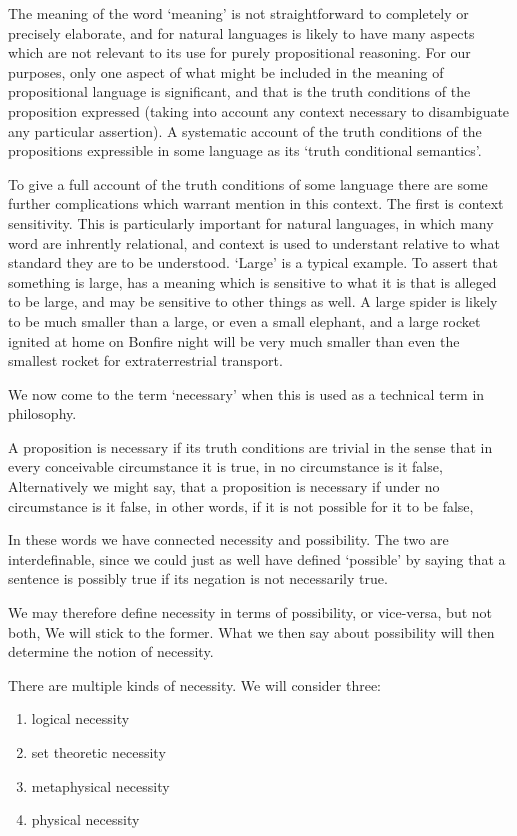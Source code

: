 The meaning of the word `meaning' is not straightforward to completely or precisely elaborate, and for natural languages is likely to have many aspects which are not relevant to its use for purely propositional reasoning.
For our purposes, only one aspect of what might be included in the meaning of propositional language is significant, and that is the truth conditions of the proposition expressed (taking into account any context necessary to disambiguate any particular assertion).
A systematic account of the truth conditions of the propositions expressible in some language as its `truth conditional semantics'.

To give a full account of the truth conditions of some language there are some further complications which warrant mention in this context.
The first is context sensitivity.
This is particularly important for natural languages, in which many word are inhrently relational, and context is used to understant relative to what standard they are to be understood.
`Large' is a typical example.
To assert that something is large, has a meaning which is sensitive to what it is that is alleged to be large, and may be sensitive to other things as well.
A large spider is likely to be much smaller than a large, or even a small elephant, and a large rocket ignited at home on Bonfire night will be very much smaller than even the smallest rocket for extraterrestrial transport.

We now come to the term `necessary' when this is used as a technical term in philosophy.

A proposition is necessary if its truth conditions are trivial in the sense that in every conceivable circumstance it is true, in no circumstance is it false,
Alternatively we might say, that a proposition is necessary if under no circumstance is it false, in other words, if it is not possible for it to be false,

In these words we have connected necessity and possibility.
The two are interdefinable, since we could just as well have defined `possible' by saying that a sentence is possibly true if its negation is not necessarily true.

We may therefore define necessity in terms of possibility, or vice-versa, but not both,
We will stick to the former.
What we then say about possibility will then determine the notion of necessity.

There are multiple kinds of necessity.
We will consider three:

\begin{enumerate}
\item logical necessity
\item set theoretic necessity
\item metaphysical necessity
\item physical necessity
\end{enumerate}

  
